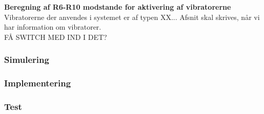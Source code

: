 \noindent\textbf{Beregning af R6-R10 modstande for aktivering af vibratorerne} \\
Vibratorerne der anvendes i systemet er af typen XX... Afsnit skal skrives, når vi har information om vibratorer.  \\

FÅ SWITCH MED IND I DET? \\

\subsubsection{Simulering}
\subsubsection{Implementering}
\subsubsection{Test}